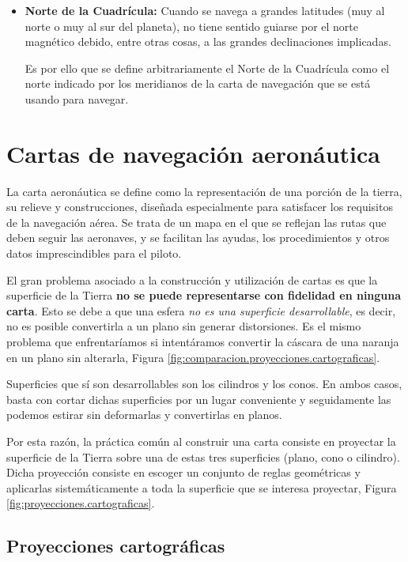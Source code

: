 \begin{itemize}
\item \textbf{Norte de la Cuadrícula:} Cuando se navega a grandes latitudes (muy al norte o muy al sur del planeta), no tiene sentido guiarse por el norte magnético debido, entre otras cosas, a las grandes declinaciones implicadas.

Es por ello que se define arbitrariamente el Norte de la Cuadrícula como el norte indicado por los meridianos de la carta de navegación que se está usando para navegar. 
\end{itemize}




\section{Cartas de navegaci\'on aeron\'autica}
\label{sec:cartas.navegacion.aeronautica}

La carta aeron\'autica se define como la representaci\'on de una porci\'on de la tierra, su relieve y construcciones, dise\~nada especialmente para satisfacer los requisitos de la navegaci\'on a\'erea. Se trata de un mapa en el que se reflejan las rutas que deben seguir las aeronaves, y se facilitan las ayudas, los procedimientos y otros datos imprescindibles para el piloto.

El gran problema asociado a la construcción y utilización de cartas es que la superficie de la Tierra \textbf{no se puede representarse con fidelidad en ninguna carta}. Esto se debe a que una esfera \emph{no es una superficie desarrollable}, es decir, no es posible convertirla a un plano sin generar distorsiones. Es el mismo problema que enfrentaríamos si intentáramos convertir la cáscara de una naranja en un plano sin alterarla, Figura \ref{fig:comparacion.proyecciones.cartograficas}. 

Superficies que sí son desarrollables son los cilindros y los conos. En ambos casos, basta con cortar dichas superficies por un lugar conveniente y seguidamente las podemos estirar sin deformarlas y convertirlas en planos.

Por esta razón, la práctica común al construir una carta consiste en proyectar la superficie de la Tierra sobre una de estas tres superficies (plano, cono o cilindro). Dicha proyección consiste en escoger un conjunto de reglas geométricas y aplicarlas sistemáticamente a toda la superficie que se interesa proyectar, Figura \ref{fig:proyecciones.cartograficas}.

\subsection{Proyecciones cartogr\'aficas}
\label{sec:proyecciones.cartograficas}

